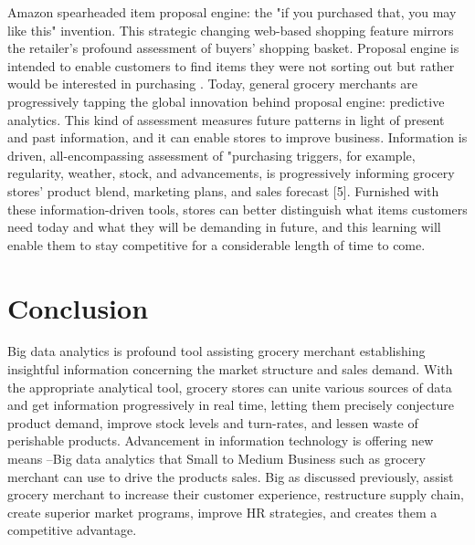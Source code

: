 \documentclass[sigconf]{acmart}
\begin{document}
Amazon spearheaded item proposal engine: the "if you purchased that, you may like this" invention. This strategic changing web-based shopping feature mirrors the retailer's profound assessment of buyers' shopping basket.  Proposal engine is intended to enable customers to find items they were not sorting out but rather would be interested in purchasing \cite{1}. Today, general grocery merchants are progressively tapping the global innovation behind proposal engine: predictive analytics. This kind of assessment measures future patterns in light of present and past information, and it can enable stores to improve business. Information is driven, all-encompassing assessment of "purchasing triggers, for example, regularity, weather, stock, and advancements, is progressively informing grocery stores' product blend, marketing plans, and sales forecast [5]. Furnished with these information-driven tools, stores can better distinguish what items customers need today and what they will be demanding in future, and this learning will enable them to stay competitive for a considerable length of time to come.  

\section{Conclusion}

Big data analytics is profound tool assisting grocery merchant establishing insightful information concerning the market structure and sales demand. With the appropriate analytical tool, grocery stores can unite various sources of data and get information progressively in real time, letting them precisely conjecture product demand, improve stock levels and turn-rates, and lessen waste of perishable products. Advancement in information technology is offering new means –Big data analytics that Small to Medium Business such as grocery merchant can use to drive the products sales. Big as discussed previously, assist grocery merchant to increase their customer experience, restructure supply chain, create superior market programs, improve HR strategies, and creates them a competitive advantage.


 


\end{document}

